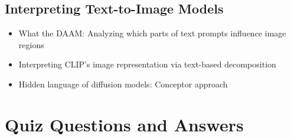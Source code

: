 \subsection*{Interpreting Text-to-Image Models}
\begin{itemize}
    \item What the DAAM: Analyzing which parts of text prompts influence image regions
    \item Interpreting CLIP's image representation via text-based decomposition
    \item Hidden language of diffusion models: Conceptor approach
\end{itemize}
\section*{Quiz Questions and Answers}

